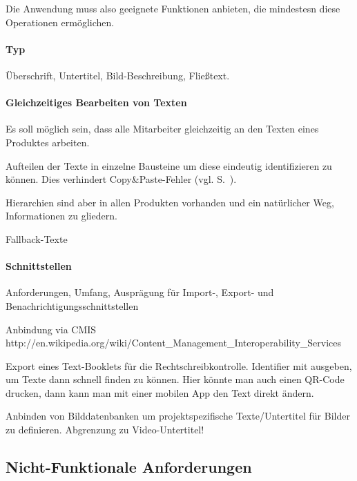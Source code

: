 Die Anwendung muss also geeignete Funktionen anbieten, die mindestesn diese Operationen ermöglichen.

\TODO

\paragraph{Typ} Überschrift, Untertitel, Bild-Beschreibung, Fließtext.

\paragraph{Gleichzeitiges Bearbeiten von Texten} Es soll möglich sein, dass alle  Mitarbeiter gleichzeitig an den Texten eines Produktes arbeiten.


Aufteilen der Texte in einzelne Bausteine um diese eindeutig identifizieren zu können. Dies verhindert Copy\&Paste-Fehler (vgl. S.~\pageref{p:serielles-konzept}).

\label{l:hierarchien} Hierarchien sind aber in allen Produkten vorhanden und ein natürlicher Weg, Informationen zu gliedern. 

Fallback-Texte

\paragraph{Schnittstellen}

Anforderungen, Umfang, Ausprägung für Import-, Export- und Benachrichtigungsschnittstellen

Anbindung via CMIS http://en.wikipedia.org/wiki/Content\_Management\_Interoperability\_Services

Export eines Text-Booklets für die Rechtschreibkontrolle. Identifier mit ausgeben, um Texte dann schnell finden zu können. Hier könnte man auch einen QR-Code drucken, dann kann man mit einer mobilen App den Text direkt ändern.

Anbinden von Bilddatenbanken um projektspezifische Texte/Untertitel für Bilder zu definieren. Abgrenzung zu Video-Untertitel!

\subsection{Nicht-Funktionale Anforderungen}\label{l:nicht-funktionale-anforderungen}

